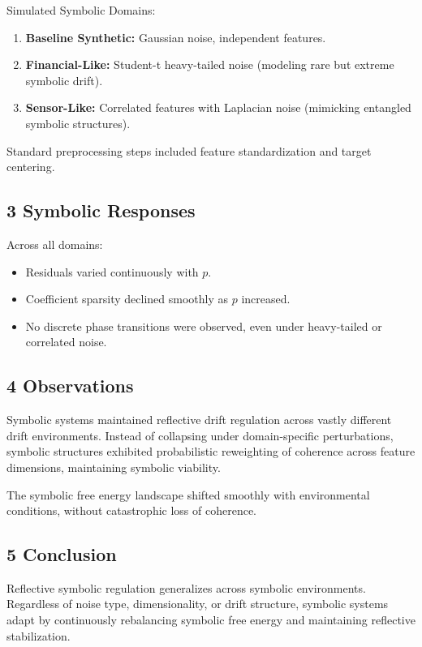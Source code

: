 Simulated Symbolic Domains:
\begin{enumerate}
    \item \textbf{Baseline Synthetic:} Gaussian noise, independent features.
    \item \textbf{Financial-Like:} Student-t heavy-tailed noise (modeling rare but extreme symbolic drift).
    \item \textbf{Sensor-Like:} Correlated features with Laplacian noise (mimicking entangled symbolic structures).
\end{enumerate}

Standard preprocessing steps included feature standardization and target centering.

\subsection*{3 Symbolic Responses}
\label{subsection:trace5_symbolic_responses}

Across all domains:
\begin{itemize}
    \item Residuals varied continuously with $p$.
    \item Coefficient sparsity declined smoothly as $p$ increased.
    \item No discrete phase transitions were observed, even under heavy-tailed or correlated noise.
\end{itemize}

\subsection*{4 Observations}
\label{subsection:trace5_observations}

Symbolic systems maintained reflective drift regulation across vastly different drift environments. Instead of collapsing under domain-specific perturbations, symbolic structures exhibited probabilistic reweighting of coherence across feature dimensions, maintaining symbolic viability.

The symbolic free energy landscape shifted smoothly with environmental conditions, without catastrophic loss of coherence.

\subsection*{5 Conclusion}
\label{subsection:trace5_conclusion}

Reflective symbolic regulation generalizes across symbolic environments. Regardless of noise type, dimensionality, or drift structure, symbolic systems adapt by continuously rebalancing symbolic free energy and maintaining reflective stabilization.

